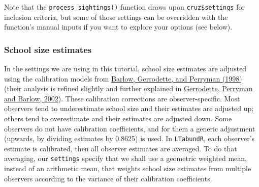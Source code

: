 \documentclass[
]{book}
\newenvironment{Shaded}{\begin{snugshade}}{\end{snugshade}}
\newcommand{\ConstantTok}[1]{\textcolor[rgb]{0.00,0.00,0.00}{#1}}
\newcommand{\DecValTok}[1]{\textcolor[rgb]{0.00,0.00,0.81}{#1}}
\newcommand{\ErrorTok}[1]{\textcolor[rgb]{0.64,0.00,0.00}{\textbf{#1}}}
\newcommand{\NormalTok}[1]{#1}
\newcommand{\SpecialCharTok}[1]{\textcolor[rgb]{0.00,0.00,0.00}{#1}}
\newcommand{\StringTok}[1]{\textcolor[rgb]{0.31,0.60,0.02}{#1}}
\begin{document}
\begin{Shaded}
\end{Shaded}

Note that the \texttt{process\_sightings()} function draws upon \texttt{cruz\$settings} for inclusion criteria, but some of those settings can be overridden with the function's manual inputs if you want to explore your options (see below).

\hypertarget{ss_calibration}{%
\subsubsection*{School size estimates}\label{ss_calibration}}

In the settings we are using in this tutorial, school size estimates are adjusted using the calibration models from \href{https://scholar.google.com/scholar?hl=en\&as_sdt=0\%2C43\&q=barlow+1998+group+size+caliration\&btnG=}{Barlow, Gerrodette, and Perryman (1998)} (their analysis is refined slightly and further explained in \href{https://scholar.google.com/scholar?hl=en\&as_sdt=0\%2C43\&q=barlow+1998+group+size+caliration\&btnG=}{Gerrodette, Perryman and Barlow, 2002}). These calibration corrections are observer-specific. Most observers tend to underestimate school size and their estimates are adjusted up; others tend to overestimate and their estimates are adjusted down. Some observers do not have calibration coefficients, and for them a generic adjustment (upwards, by dividing estimates by 0.8625) is used. In \texttt{LTabundR}, each observer's estimate is calibrated, then all observer estimates are averaged. To do that averaging, our \texttt{settings} specify that we shall use a geometric weighted mean, instead of an arithmetic mean, that weights school size estimates from multiple observers according to the variance of their calibration coefficients.
\end{document}

